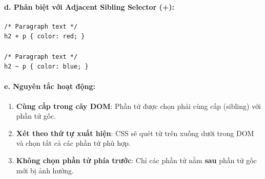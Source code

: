 \documentclass[11pt,oneside]{book}
\newcommand{\thd}[1]{\textcolor{white}{\textbf{\strut #1}}}
\begin{document}
\paragraph{d. Phân biệt với Adjacent Sibling Selector (+):}

\begin{prettyTableBox}
\sffamily\small
{}
\end{prettyTableBox}

\begin{codeWindow}
\begin{lstlisting}[language=CSS3]
/* Paragraph text */
h2 + p { color: red; }

/* Paragraph text */
h2 ~ p { color: blue; }
\end{lstlisting}
\end{codeWindow}

\paragraph{e. Nguyên tắc hoạt động:}

\begin{noteBox}
\begin{enumerate}[leftmargin=1.5em, itemsep=3pt, parsep=0pt]
    \item \textbf{Cùng cấp trong cây DOM}: Phần tử được chọn phải cùng cấp (sibling) với phần tử gốc.
    \item \textbf{Xét theo thứ tự xuất hiện}: CSS sẽ quét từ trên xuống dưới trong DOM và chọn tất cả các phần tử phù hợp.
    \item \textbf{Không chọn phần tử phía trước}: Chỉ các phần tử nằm \textbf{sau} phần tử gốc mới bị ảnh hưởng.
\end{enumerate}
\end{noteBox}
\end{document}
